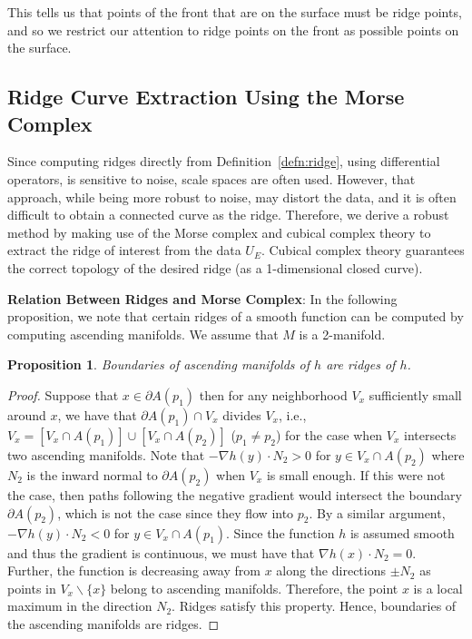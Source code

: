 \documentclass[10pt,journal,compsoc]{IEEEtran}
\newcommand{\R}{\mathbb{R}}
\newcommand{\comment}[1]{ }
\newtheorem{prop}{Proposition}
\begin{document}
This tells us that points of the front that are on the surface must be
ridge points, and so we restrict our attention to ridge points on the
front as possible points on the surface.

\subsection{Ridge Curve Extraction Using the Morse Complex}

Since computing ridges directly from Definition~\ref{defn:ridge},
using differential operators, is sensitive to noise, scale spaces
\cite{lindeberg1998edge,kolomenkin2013multi} are often used. However,
that approach, while being more robust to noise, may distort the data,
and it is often difficult to obtain a connected curve as the
ridge. Therefore, we derive a robust method by making use of the Morse
complex and cubical complex theory to extract the ridge of interest
from the data $U_E$. Cubical complex theory guarantees the correct
topology of the desired ridge (as a 1-dimensional closed curve).

\comment{
Let $h : M \subset \R^n \to \R$ be a function from an
$n-1$ dimensional manifold $M$ to the real line. In our case, the
manifold $M$ is the Fast marching front at a particular time instant,
and the function $h$ is the Euclidean length of minimal paths ending
on the front, $d_E$. 
}

{\bf Relation Between Ridges and Morse Complex}: In the following
proposition, we note that certain ridges of a smooth function can be
computed by computing ascending manifolds. We assume that $M$ is a
2-manifold.
\begin{prop}
  Boundaries of ascending manifolds of $h$ are ridges of $h$.
\end{prop}
\begin{proof}
  Suppose that $x\in \partial A(p_1)$ then for any neighborhood $V_x$
  sufficiently small around $x$, we have that
  $\partial A(p_1) \cap V_x$ divides $V_x$, i.e.,
  $V_x = [V_x \cap A(p_1)] \cup [V_x \cap A(p_2)]$ ($p_1\neq p_2$) for
  the case when $V_x$ intersects two ascending manifolds. Note that
  $-\nabla h(y) \cdot N_2 > 0$ for $y \in V_x \cap A(p_2)$ where $N_2$
  is the inward normal to $\partial A(p_2)$ when $V_x$ is small
  enough. If this were not the case, then paths following the negative
  gradient would intersect the boundary $\partial A(p_2)$, which is
  not the case since they flow into $p_2$. By a similar argument,
  $-\nabla h(y) \cdot N_2 < 0$ for $y \in V_x \cap A(p_1)$. Since the
  function $h$ is assumed smooth and thus the gradient is continuous,
  we must have that $\nabla h(x) \cdot N_2 = 0$. Further, the function
  is decreasing away from $x$ along the directions $\pm N_2$ as points
  in $V_x \backslash \{x\}$ belong to ascending manifolds. Therefore,
  the point $x$ is a local maximum in the direction $N_2$. Ridges
  satisfy this property.  Hence, boundaries of the ascending manifolds
  are ridges.
\end{proof}
\end{document}
